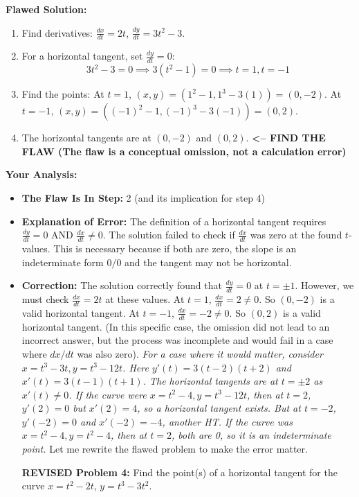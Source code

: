 \documentclass{article}
\begin{document}
\textbf{Flawed Solution:}
\begin{enumerate}
    \item Find derivatives: $\frac{dx}{dt} = 2t$, $\frac{dy}{dt} = 3t^2-3$.
    \item For a horizontal tangent, set $\frac{dy}{dt} = 0$:
    \[ 3t^2 - 3 = 0 \implies 3(t^2-1)=0 \implies t = 1, t = -1 \]
    \item Find the points:
    At $t=1$, $(x,y) = (1^2-1, 1^3-3(1)) = (0, -2)$.
    At $t=-1$, $(x,y) = ((-1)^2-1, (-1)^3-3(-1)) = (0, 2)$.
    \item The horizontal tangents are at $(0, -2)$ and $(0, 2)$.
    \quad \longleftarrow \textbf{<-- FIND THE FLAW (The flaw is a conceptual omission, not a calculation error)}
\end{enumerate}
\textbf{Your Analysis:}
\begin{itemize}
    \item \textbf{The Flaw Is In Step:} 2 (and its implication for step 4)
    \item \textbf{Explanation of Error:} The definition of a horizontal tangent requires $\frac{dy}{dt}=0$ AND $\frac{dx}{dt} \neq 0$. The solution failed to check if $\frac{dx}{dt}$ was zero at the found $t$-values. This is necessary because if both are zero, the slope is an indeterminate form $0/0$ and the tangent may not be horizontal.
    \item \textbf{Correction:}
    The solution correctly found that $\frac{dy}{dt}=0$ at $t=\pm 1$. However, we must check $\frac{dx}{dt}=2t$ at these values.
    At $t=1$, $\frac{dx}{dt}=2 \neq 0$. So $(0,-2)$ is a valid horizontal tangent.
    At $t=-1$, $\frac{dx}{dt}=-2 \neq 0$. So $(0,2)$ is a valid horizontal tangent.
    (In this specific case, the omission did not lead to an incorrect answer, but the process was incomplete and would fail in a case where $dx/dt$ was also zero).
    \textit{For a case where it would matter, consider $x=t^3-3t, y=t^3-12t$. Here $y'(t) = 3(t-2)(t+2)$ and $x'(t) = 3(t-1)(t+1)$. The horizontal tangents are at $t=\pm 2$ as $x'(t) \neq 0$. If the curve were $x=t^2-4, y=t^3-12t$, then at $t=2$, $y'(2)=0$ but $x'(2)=4$, so a horizontal tangent exists. But at $t=-2$, $y'(-2)=0$ and $x'(-2)=-4$, another HT. If the curve was $x=t^2-4, y=t^2-4$, then at $t=2$, both are 0, so it is an indeterminate point.} Let me rewrite the flawed problem to make the error matter.

\textbf{REVISED Problem 4:} Find the point(s) of a horizontal tangent for the curve $x=t^2-2t$, $y=t^3-3t^2$.


\end{itemize}
\end{document}
